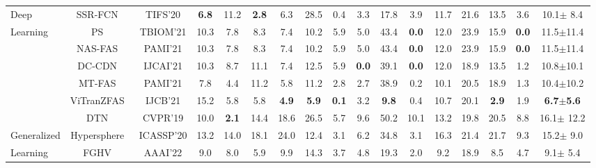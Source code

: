 \documentclass[10pt,journal,compsoc]{IEEEtran}
\begin{document}
\begin{table}
{\begin{tabular}{l|c|c|c|c|c|c|c|c|c|c|c|c|c|c|c|c}
\cline{2-17}
\quad Deep
& SSR-FCN~\cite{deb2020look} & TIFS'20 & \textbf{6.8} & 11.2 & \textbf{2.8} & 6.3 & 28.5 & 0.4 & 3.3 & 17.8 & 3.9 & 11.7 & 21.6 & 13.5 & 3.6 & 10.1$\pm$ 8.4 \\

\cline{2-17}
Learning
& PS~\cite{yu2021revisiting} & TBIOM'21 & 10.3 & 7.8 & 8.3 & 7.4 & 10.2 & 5.9 & 5.0 & 43.4 & \textbf{0.0} & 12.0 & 23.9 & 15.9 & \textbf{0.0} & 11.5$\pm$11.4 \\

\cline{2-17}
& NAS-FAS~\cite{yu2021revisiting} & PAMI'21 & 10.3 & 7.8 & 8.3 & 7.4 & 10.2 & 5.9 & 5.0 & 43.4 & \textbf{0.0} & 12.0 & 23.9 & 15.9 & \textbf{0.0} & 11.5$\pm$11.4 \\

\cline{2-17}

& DC-CDN~\cite{yu2021dual} & IJCAI'21 & 10.3 & 8.7 & 11.1  & 7.4 & 12.5 & 5.9 & \textbf{0.0} & 39.1 & \textbf{0.0} & 12.0 & 18.9 & 13.5 & 1.2 & 10.8$\pm$10.1 \\

\cline{2-17}

& MT-FAS~\cite{qin2021meta} & PAMI'21 & 7.8 & 4.4 & 11.2  & 5.8 & 11.2 & 2.8 & 2.7 & 38.9 & 0.2 & 10.1 & 20.5 & 18.9 & 1.3 & 10.4$\pm$10.2 \\

\cline{2-17}

& ViTranZFAS~\cite{george2020effectiveness} & IJCB'21 & 15.2 & 5.8 & 5.8  & \textbf{4.9} & \textbf{5.9} & \textbf{0.1} & 3.2 & \textbf{9.8} & 0.4 & 10.7 & 20.1 & \textbf{2.9} & 1.9 & \textbf{6.7$\pm$5.6} \\


\cline{1-17}

& DTN~\cite{liu2019deep}
 & CVPR'19 & 10.0 & \textbf{2.1} & 14.4 & 18.6 & 26.5 & 5.7 & 9.6 & 50.2 & 10.1 & 13.2 & 19.8 & 20.5 & 8.8 & 16.1$\pm$ 12.2 \\

\cline{2-17}
Generalized
& Hypersphere~\cite{li2020unseen}
 & ICASSP'20 & 13.2 & 14.0 & 18.1  & 24.0 & 12.4 & 3.1 & 6.2 & 34.8 & 3.1 & 16.3 & 21.4 & 21.7 & 9.3 & 15.2$\pm$ 9.0 \\

\cline{2-17}
Learning
& FGHV~\cite{wang2022domain} & AAAI'22 & 9.0 & 8.0 & 5.9 & 9.9 & 14.3 & 3.7 & 4.8 & 19.3 & 2.0 & 9.2 & 18.9 & 8.5 & 4.7 & 9.1$\pm$ 5.4 \\

\bottomrule[1pt]



\end{tabular}
}

\label{tab:SiW-M}
\end{table}
\end{document}
